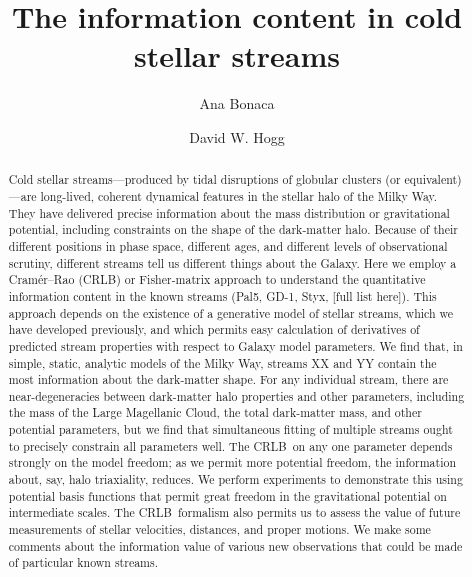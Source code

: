 \documentclass[modern]{aastex61}
\newcommand{\acronym}[1]{{\small{#1}}}
\newcommand{\CRLB}{\acronym{CRLB}}
\begin{document}
\sloppy\sloppypar\raggedbottom\frenchspacing %

\title{The information content in cold stellar streams}


\author[0000-0002-7846-9787]{Ana Bonaca}

\author[0000-0003-2866-9403]{David W. Hogg}

\begin{abstract}\noindent %
Cold stellar streams---produced by tidal disruptions of globular
clusters (or equivalent)---are long-lived, coherent dynamical features
in the stellar halo of the Milky Way.
They have delivered precise information about the mass distribution or
gravitational potential, including constraints on the shape of the
dark-matter halo.
Because of their different positions in phase space, different ages,
and different levels of observational scrutiny, different streams tell
us different things about the Galaxy.
Here we employ a Cram\'er--Rao (\CRLB) or Fisher-matrix approach to
understand the quantitative information content in the known
streams (Pal5, GD-1, Styx, [full list here]).
This approach depends on the existence of a generative model of
stellar streams, which we have developed previously, and which permits
easy calculation of derivatives of predicted stream properties with
respect to Galaxy model parameters.
We find that, in simple, static, analytic models of the Milky Way,
streams XX and YY contain the most information about the dark-matter
shape.
For any individual stream, there are near-degeneracies between
dark-matter halo properties and other parameters, including the mass
of the Large Magellanic Cloud, the total dark-matter mass, and other
potential parameters, but we find that simultaneous fitting of multiple
streams ought to precisely constrain all parameters well.
The \CRLB\ on any one parameter depends strongly on the model freedom;
as we permit more potential freedom, the information about, say, halo
triaxiality, reduces.
We perform experiments to demonstrate this using potential basis
functions that permit great freedom in the gravitational potential on intermediate
scales.
The \CRLB\ formalism also permits us to assess the value of future
measurements of stellar velocities, distances, and proper motions. We
make some comments about the information value of various new
observations that could be made of particular known streams.
\end{abstract}
\end{document}
